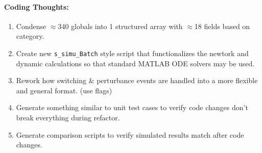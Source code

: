 \documentclass[12pt]{article}
\begin{document}
\begin{multicols}{2}
\paragraph{Coding Thoughts:} 
	\begin{enumerate}

		\itemsep 0em 
		\item Condense $\approx$340 globals into 1 structured array with $\approx$18 fields based on category.
		\item Create new \verb|s_simu_Batch| style script that functionalizes the newtork and dynamic calculations so that standard MATLAB ODE solvers may be used.
		\item Rework how switching \& perturbance events are handled into a more flexible and general format. (use flags)
		\item Generate something similar to unit test cases to verify code changes don't break everything during refactor.
		\item Generate comparison scripts to verify simulated results match after code changes.
	\end{enumerate}
	





\vfill\null
\end{multicols}
\end{document}
